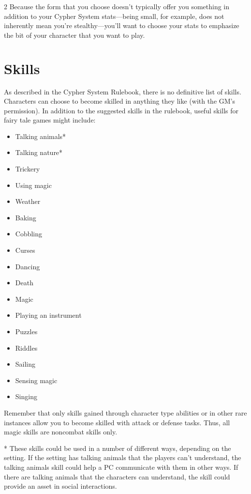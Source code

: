 \begin{multicols}{2}
Because the form that you choose doesn’t typically offer you something in addition to your Cypher System stats—being small, for example, does not inherently mean you’re stealthy—you’ll want to choose your stats to emphasize the bit of your character that you want to play.

\section{Skills}

As described in the Cypher System Rulebook, there is no definitive list of skills. Characters can choose to become skilled in anything they like (with the GM’s permission). In addition to the suggested skills in the rulebook, useful skills for fairy tale games might include: 

\begin{itemize}
\item Talking animals*
\item Talking nature*
\item Trickery
\item Using magic 
\item Weather
\item Baking
\item Cobbling 
\item Curses
\item Dancing 
\item Death
\item Magic
\item Playing an instrument 
\item Puzzles
\item Riddles
\item Sailing
\item Sensing magic 
\item Singing
\end{itemize}

Remember that only skills gained through character type abilities or in other rare instances allow you to become skilled with attack or defense tasks. Thus, all magic skills are noncombat skills only.

* These skills could be used in a number of different ways, depending on the setting. If the setting has talking animals that the players can’t understand, the talking animals skill could help a PC communicate with them in other ways. If there are talking animals that the characters can understand, the skill could provide an asset in social interactions.


\end{multicols}
